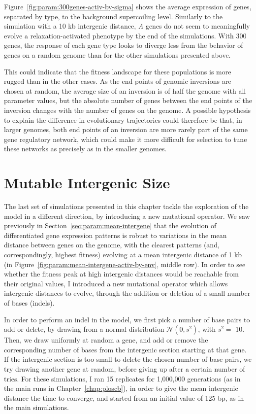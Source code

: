 Figure~\ref{fig:param:300genes-activ-by-sigma} shows the average expression of genes, separated by type, to the background supercoiling level.
Similarly to the simulation with a 10 kb intergenic distance, \emph{A} genes do not seem to meaningfully evolve a relaxation-activated phenotype by the end of the simulations.
With 300 genes, the response of each gene type looks to diverge less from the behavior of genes on a random genome than for the other simulations presented above.

This could indicate that the fitness landscape for these populations is more rugged than in the other cases.
As the end points of genomic inversions are chosen at random, the average size of an inversion is of half the genome with all parameter values, but the absolute number of genes between the end points of the inversion changes with the number of genes on the genome.
A possible hypothesis to explain the difference in evolutionary trajectories could therefore be that, in larger genomes, both end points of an inversion are more rarely part of the same gene regulatory network, which could make it more difficult for selection to tune these networks as precisely as in the smaller genomes.

\FloatBlock


\section{Mutable Intergenic Size}
\label{sec:param:evolve-intergene}

The last set of simulations presented in this chapter tackle the exploration of the model in a different direction, by introducing a new mutational operator.
We saw previously in Section~\ref{sec:param:mean-intergene} that the evolution of differentiated gene expression patterns is robust to variations in the mean distance between genes on the genome, with the clearest patterns (and, correspondingly, highest fitness) evolving at a mean intergenic distance of 1 kb (in Figure~\ref{fig:param:mean-intergene-activ-by-env}, middle row).
In order to see whether the fitness peak at high intergenic distances would be reachable from their original values, I introduced a new mutational operator which allows intergenic distances to evolve, through the addition or deletion of a small number of bases (indels).

In order to perform an indel in the model, we first pick a number of base pairs to add or delete, by drawing from a normal distribution $\mathcal{N}(0, s^2)$, with $s^2 = $ 10.
Then, we draw uniformly at random a gene, and add or remove the corresponding number of bases from the intergenic section starting at that gene.
If the intergenic section is too small to delete the chosen number of base pairs, we try drawing another gene at random, before giving up after a certain number of tries.
For these simulations, I ran 15 replicates for 1,000,000 generations (as in the main runs in Chapter~\ref{chap:ploscb}), in order to give the mean intergenic distance the time to converge, and started from an initial value of 125 bp, as in the main simulations.

